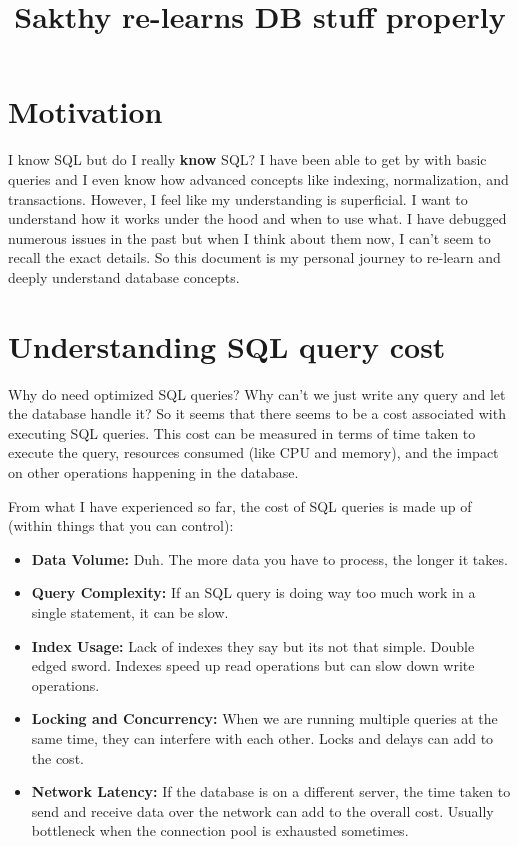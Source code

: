 \documentclass[11pt]{article}
\title{Sakthy re-learns DB stuff properly}
\begin{document}
\maketitle
\tableofcontents
\newpage

\section{Motivation}
I know SQL but do I really \textbf{know} SQL? I have been able to get by with basic queries and I even know how advanced concepts like indexing, normalization, and transactions. However, I feel like my understanding is superficial. I want to understand how it works under the hood and when to use what. I have debugged numerous issues in the past but when I think about them now, I can't seem to recall the exact details. So this document is my personal journey to re-learn and deeply understand database concepts.

\section{Understanding SQL query cost}
Why do need optimized SQL queries? Why can't we just write any query and let the database handle it? So it seems that there seems to be a cost associated with executing SQL queries. This cost can be measured in terms of time taken to execute the query, resources consumed (like CPU and memory), and the impact on other operations happening in the database.


From what I have experienced so far, the cost of SQL queries is made up of (within things that you can control):
\begin{itemize}
    \item \textbf{Data Volume:} Duh. The more data you have to process, the longer it takes.
    \item \textbf{Query Complexity:} If an SQL query is doing way too much work in a single statement, it can be slow.
    \item \textbf{Index Usage:} Lack of indexes they say but its not that simple. Double edged sword. Indexes speed up read operations but can slow down write operations.
    \item \textbf{Locking and Concurrency:} When we are running multiple queries at the same time, they can interfere with each other. Locks and delays can add to the cost.
    \item \textbf{Network Latency:} If the database is on a different server, the time taken to send and receive data over the network can add to the overall cost. Usually bottleneck when the connection pool is exhausted sometimes.
\end{itemize}
\end{document}
